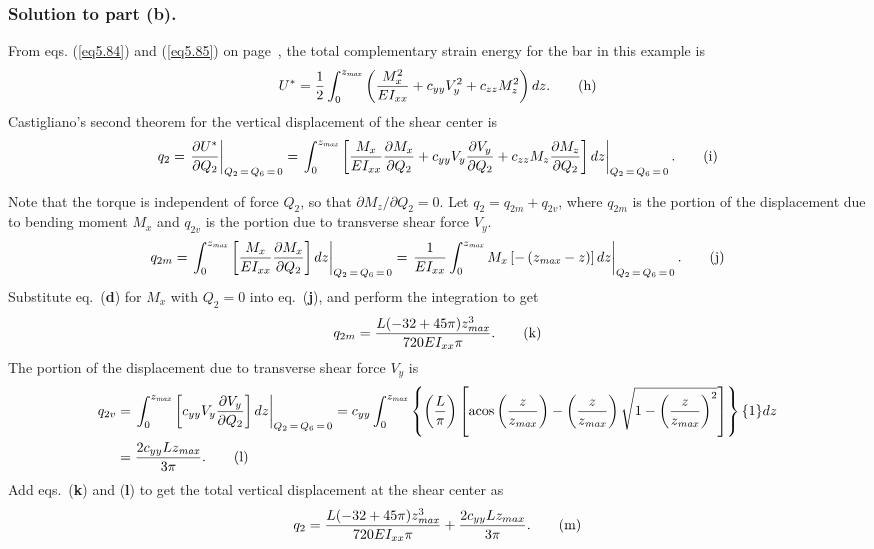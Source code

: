 \documentclass{AeroStructure-ERJohnson}
\begin{document}
\begin{example*}
\subsubsection{Solution to part (b).} From eqs. (\ref{eq5.84}) and (\ref{eq5.85}) on page~\pageref{eq5.84}, the total complementary strain energy for the bar in this example is
\begin{equation*}
U^{*}=\frac{1}{2} \int_{0}^{z_{\it max}}\left(\frac{M_{x}^{2}}{E I_{x x}}+c_{y y} V_{y}^{2}+c_{z z} M_{z}^{2}\right) d z.\tag{h}
\end{equation*}
Castigliano's second theorem for the vertical displacement of the shear center is
\begin{equation*}
q_{2}=\left.\frac{\partial U^{*}}{\partial Q_{2}}\right|_{Q_{2}\,=\,Q_{6}\,=\,0}=\left.\int_{0}^{z_{\it max }}\left[\frac{M_{x}}{E I_{x x}} \frac{\partial M_{x}}{\partial Q_{2}}+c_{y y} V_{y} \frac{\partial V_{y}}{\partial Q_{2}}+c_{z z} M_{z} \frac{\partial M_{z}}{\partial Q_{2}}\right] d z\right|_{Q_{2}\,=\,Q_{6}\,=\,0}.\tag{i}
\end{equation*}
\vspace*{5pt}
\clearpage

\noindent Note that the torque is independent of force $Q_2$, so that $\partial M_{z}/\partial Q_{2}=0$. Let $q_{2}=q_{2 m}+q_{2 v}$, where $q_{2 m}$ is the portion of the displacement due to bending moment $M_x$ and $q_{2 v}$ is the portion due to transverse shear force $V_y$.
\begin{equation*}
q_{2 m}=\left.\int_{0}^{z_{\it max }}\left[\frac{M_{x}}{E I_{x x}} \frac{\partial M_{x}}{\partial Q_{2}}\right] d z\right|_{Q_{2}\,=\,Q_{6}\,=\,0}=\left.\frac{1}{E I_{x x}} \int_{0}^{z_{\it max }} M_{x}\left[-\left(z_{\it max }-z\right)\right] d z\right|_{Q_{2}\,=\,Q_{6}\,=\,0}.\tag{j}
\end{equation*}
Substitute eq.~(\textbf{d}) for $M_x$ with $Q_2 = 0$ into eq.~(\textbf{j}), and perform the integration to get
\begin{equation*}
q_{2 m}=\frac{L(-32+45 \pi) z_{\it max }^{3}}{720 E I_{x x} \pi}.\tag{k}
\end{equation*}
The portion of the displacement due to transverse shear force $V_y$ is
\begin{align*}
q_{2 v}&=\left.\int_{0}^{z_{\it max }}\left[c_{y y} V_{y} \frac{\partial V_{y}}{\partial Q_{2}}\right] d z\right|_{Q_{2}\,=\,Q_{6}\,=\,0}=c_{y y} \int_{0}^{z_{\it max }}\left\{\left(\frac{L}{\pi}\right)\left[\operatorname{acos}\left(\frac{z}{z_{\it max }}\right)-\left(\frac{z}{z_{\it max }}\right) \sqrt{1-\left(\frac{z}{z_{\it max }}\right)^{2}}\right]\right\}\{1\} d z\nonumber\\
&=\frac{2 c_{y y} L z_{\it max }}{3 \pi}.\tag{l}
\end{align*}
Add eqs.~(\textbf{k}) and (\textbf{l}) to get the total vertical displacement at the shear center as
\begin{equation*}
q_{2}=\frac{L(-32+45 \pi) z_{\it max }^{3}}{720 E I_{x x} \pi}+\frac{2 c_{y y} L z_{m a x}}{3 \pi}.\tag{m}
\end{equation*}


\end{example*}
\end{document}
